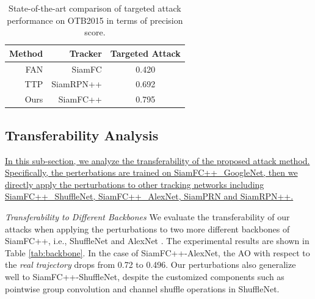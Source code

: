 \documentclass[journal]{IEEEtran}
\newcommand{\ie}{i.e.}
\begin{document}
\begin{table}[t]
  \centering
  \caption{State-of-the-art comparison of targeted attack performance on OTB2015 in terms of precision score.}
  \begin{tabular}{@{}rrc@{}}
  \toprule
  Method & Tracker &  Targeted Attack \\
  \midrule
  FAN & SiamFC  &0.420 \\
  TTP & SiamRPN++ &0.692 \\
  \midrule
  Ours & SiamFC++  &0.795 \\ \bottomrule
  \end{tabular}
  \label{tab:SOTA1}
\end{table}

\subsection{Transferability Analysis}

\uline{In this sub-section, we analyze the transferability of the proposed attack method. Specifically, the perterbations are trained on SiamFC++\_GoogleNet, then we directly apply the perturbations to other tracking networks including SiamFC++\_ShuffleNet, SiamFC++\_AlexNet, SiamPRN and SiamRPN++.}

\textit{Transferability to Different Backbones} We evaluate the transferability of our attacks when applying the perturbations to two more different backbones of SiamFC++, \ie, ShuffleNet \cite{ShuffleNet} and AlexNet \cite{AlexNet}.
The experimental results are shown in Table \ref{tab:backbone}. In the case of SiamFC++-AlexNet, the AO with respect to the \textit{real trajectory} drops from 0.72 to 0.496. 
Our perturbations also generalize well to SiamFC++-ShuffleNet, despite the customized components such as pointwise group convolution and channel shuffle operations in ShuffleNet.
\end{document}
